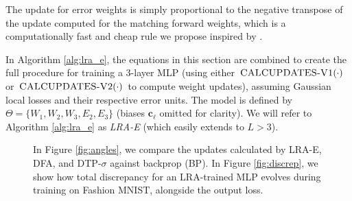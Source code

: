 \documentclass[letterpaper]{article} %
\begin{document}
The update for error weights is simply proportional to the negative transpose of the update computed for the matching forward weights, which is a computationally fast and cheap rule we propose inspired by \cite{rao1997dynamic}. 

In Algorithm \ref{alg:lra_e}, the equations in this section are combined to create the full procedure for training a 3-layer MLP (using either $\Call{CALCUPDATES-V1}{\cdot}$ or $\Call{CALCUPDATES-V2}{\cdot}$ to compute weight updates), assuming Gaussian local losses and their respective error units. The model is defined by $\Theta = \{ W_1, W_2, W_3, E_2, E_3\}$ (biases $\mathbf{c}_\ell$ omitted for clarity). We will refer to Algorithm \ref{alg:lra_e} as \emph{LRA-E} (which easily extends to $L > 3$).

\begin{figure}
\centering     %
{}
\hspace{0.15cm}
\vspace{-0.3cm}
\caption{In Figure \ref{fig:angles}, we compare the updates calculated by LRA-E, DFA, and DTP-$\sigma$ against backprop (BP). In Figure \ref{fig:discrep}, we show how total discrepancy for an LRA-trained MLP evolves during training on Fashion MNIST, alongside the output loss.}
\label{fig:lra_algos}
\end{figure}
\end{document}
